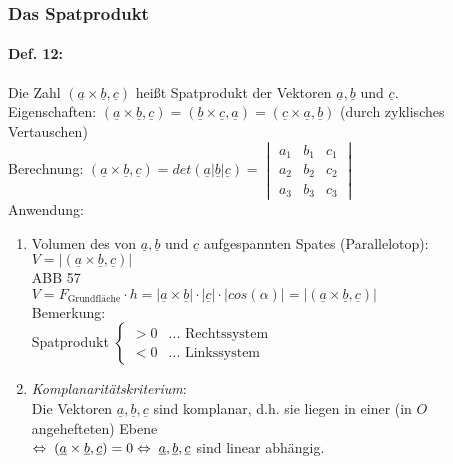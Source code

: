 \subsubsection{Das Spatprodukt}
\paragraph{Def. 12:} \parskp
Die Zahl $(\underline{a} \times \underline{b}, \underline{c})$ heißt Spatprodukt der Vektoren $\underline{a}, \underline{b}$ und $\underline{c}$.\\
Eigenschaften: 
$(\underline{a} \times \underline{b},\underline{c})=(\underline{b} \times \underline{c}, \underline{a})=(\underline{c}\times \underline{a}, \underline{b})$ (durch zyklisches Vertauschen)\\
Berechnung: $\boxed{(\underline{a} \times \underline{b}, \underline{c})= det(\underline{a} |\underline{b}|\underline{c})= \begin{vmatrix}
a_1 & b_1 & c_1\\
a_2 & b_2 & c_2\\
a_3 & b_3 & c_3
\end{vmatrix}}$\\
Anwendung: 
\begin{enumerate}
\item Volumen des von $\underline{a}, \underline{b}$ und $\underline{c}$ aufgespannten Spates (Parallelotop): $\boxed{V=|(\underline{a}\times \underline{b}, \underline{c})|}$\\
ABB 57\\
$V=F_{\text{Grundfläche}} \cdot h=|\underline{a}\times \underline{b}| \cdot |\underline{c}| \cdot |cos(\alpha)|=|(\underline{a}\times \underline{b}, \underline{c})|$\\
Bemerkung:\\
Spatprodukt $\begin{cases}
>0 & \text{... Rechtssystem}\\
<0 & \text{... Linkssystem}
\end{cases}$
\item \emph{Komplanaritätskriterium}:\\
Die Vektoren $\underline{a}, \underline{b}, \underline{c}$ sind komplanar, d.h. sie liegen in einer (in $O$ angehefteten) Ebene \\
$\Leftrightarrow \; (\underline{a} \times \underline{b}, \underline{c})=0 \\
\Leftrightarrow\;  \underline{a}, \underline{b}, \underline{c}$ sind linear abhängig.
\end{enumerate}


